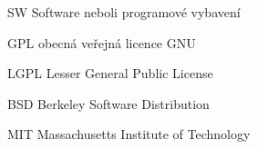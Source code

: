 \hspace{0.5cm} 

SW \dotfill Software neboli programové vybavení

GPL \dotfill obecná veřejná licence GNU

LGPL \dotfill Lesser General Public License

BSD \dotfill Berkeley Software Distribution

MIT \dotfill Massachusetts Institute of Technology